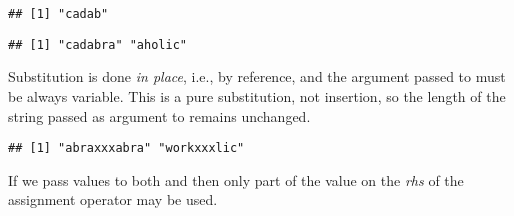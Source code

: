 \documentclass[krantz2]{krantz}\usepackage{knitr}
\begin{document}
\begin{knitrout}\footnotesize
{}\color{fgcolor}\begin{kframe}
\begin{alltt}
\hlstd{(} \hlstd{=} \hlstd{,}  \hlstd{=} \hlstd{,}  \hlstd{=} \hlstd{)}
\end{alltt}
\begin{verbatim}
## [1] "cadab"
\end{verbatim}
\begin{alltt}
\hlstd{(} \hlstd{=} \hlstd{(}\hlstd{,} \hlstd{),}  \hlstd{=} \hlstd{,}  \hlstd{=} \hlstd{)}
\end{alltt}
\begin{verbatim}
## [1] "cadabra" "aholic"
\end{verbatim}
\end{kframe}
\end{knitrout}

Substitution is done \emph{in place}, i.e., by reference, and the argument passed to  must be always variable. This is a pure substitution, not insertion, so the length of the string passed as argument to  remains unchanged.

\begin{knitrout}\footnotesize
{}\color{fgcolor}\begin{kframe}
\begin{alltt}
 \hlkwb{<-} \hlstd{(}\hlstd{,} \hlstd{)}
\hlstd{(}   \hlstd{=} \hlstd{,}  \hlstd{=} \hlstd{)} \hlkwb{<-} 
\end{alltt}
\begin{verbatim}
## [1] "abraxxxabra" "workxxxlic"
\end{verbatim}
\end{kframe}
\end{knitrout}

If we pass values to both  and  then only part of the value on the \emph{rhs} of the assignment operator \code{<-} may be used.
\end{document}
